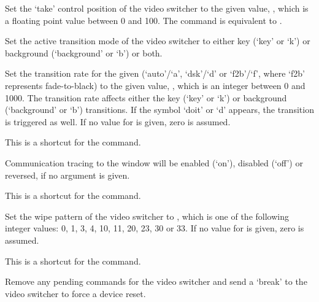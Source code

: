   Set the `take' control position of the video switcher to the given value, ,
  which is a floating point value between 0 and 100.
  The command is equivalent to .

  Set the active transition mode of the video switcher to either key (`key' or `k') or background
  (`background' or `b') or both.

  Set the transition rate for the given  (`auto'/`a', `dsk'/`d' or `f2b'/`f',
  where `f2b' represents fade-to-black) to the given value, ,
  which is an integer between 0 and 1000.
  The transition rate affects either the key (`key' or `k') or background (`background' or `b')
  transitions.
  If the symbol `doit' or `d' appears, the transition is triggered as well.
  If no value for  is given, zero is assumed.

  This is a shortcut for the  command.

  Communication tracing to the \MaxName{} window will be enabled (`on'), disabled (`off') or reversed,
  if no argument is given.

  This is a shortcut for the  command.

  Set the wipe pattern of the video switcher to , which is one of the following
  integer values: 0, 1, 3, 4, 10, 11, 20, 23, 30 or 33.
  If no value for  is given, zero is assumed.

  This is a shortcut for the  command.

  Remove any pending commands for the video switcher and send a `break' to the video switcher to
  force a device reset.
  
  \objListCmdEnd

\objItemFile

\objItemMessage



%

